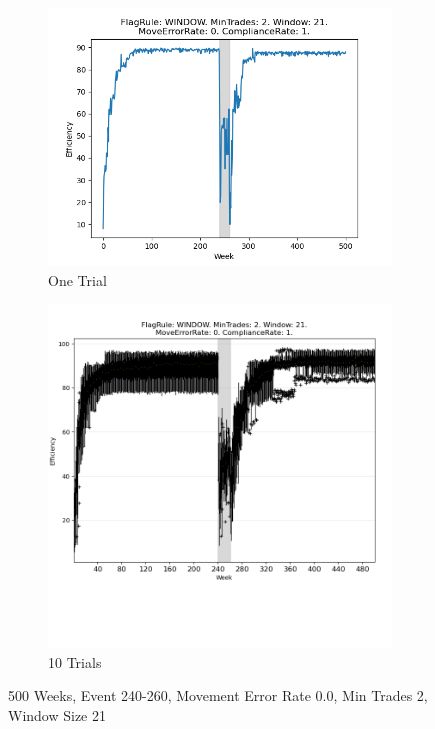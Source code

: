 \documentclass{article}%
\begin{document}
%


\begin{figure}[!htb]%
\begin{subfigure}[b]{0.45\linewidth}%
\includegraphics[width=\linewidth]{2054fr_WINDOW_mt_2_ws_21_er_0_cr_1_t1.png}%
\caption{One Trial}%
\end{subfigure}%
\begin{subfigure}[b]{0.45\linewidth}%
\includegraphics[clip,width=\linewidth,trim=0 4cm 0 0]{2054fr_WINDOW_mt_2_ws_21_er_0_cr_1_t10.png}%
\caption{10 Trials}%
\end{subfigure}%
\caption{500 Weeks, Event 240{-}260, Movement Error Rate 0.0, Min Trades 2, Window Size 21}%
\end{figure}
\end{document}
